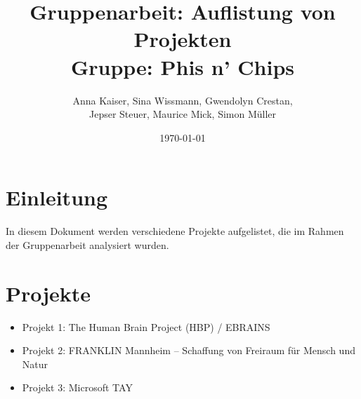 \documentclass{article}
\title{
    \vspace*{5cm}
    Gruppenarbeit: Auflistung von Projekten \\ Gruppe: Phis n' Chips}
\author{Anna Kaiser, Sina Wissmann, Gwendolyn Crestan, \\ Jepser Steuer, Maurice Mick, Simon Müller}
\date{\today}
\begin{document}
\maketitle
\clearpage %
\section{Einleitung}
In diesem Dokument werden verschiedene Projekte aufgelistet, die im Rahmen der Gruppenarbeit analysiert wurden.

\section{Projekte}
\begin{itemize}
    \item Projekt 1: The Human Brain Project (HBP) / EBRAINS
    \item Projekt 2: FRANKLIN Mannheim – Schaffung von Freiraum für Mensch und Natur
    \item Projekt 3: Microsoft TAY
\end{itemize}

\clearpage

\end{document}
